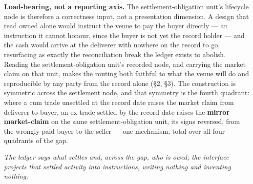 \medskip\noindent\textbf{Load-bearing, not a reporting axis.} The settlement-obligation
unit's lifecycle node is therefore a correctness input, not a presentation dimension. A
design that read owned alone would instruct the venue to pay the buyer directly --- an
instruction it cannot honour, since the buyer is not yet the record holder --- and the
cash would arrive at the deliverer with nowhere on the record to go, resurfacing as
exactly the reconciliation break the ledger exists to abolish. Reading the
settlement-obligation unit's recorded node, and carrying the market claim on that unit,
makes the routing both faithful to what the venue will do and reproducible by any party
from the record alone (\S2, \S3). The construction is symmetric across the settlement
node, and that symmetry is the fourth quadrant: where a cum trade unsettled at the record
date raises the market claim from deliverer to buyer, an ex trade settled by the record
date raises the \textbf{mirror market-claim} on the same settlement-obligation unit, its
signs reversed, from the wrongly-paid buyer to the seller --- one mechanism, total over
all four quadrants of the gap.

\emph{The ledger says what settles and, across the gap, who is owed; the interface
projects that settled activity into instructions, writing nothing and inventing
nothing.}
